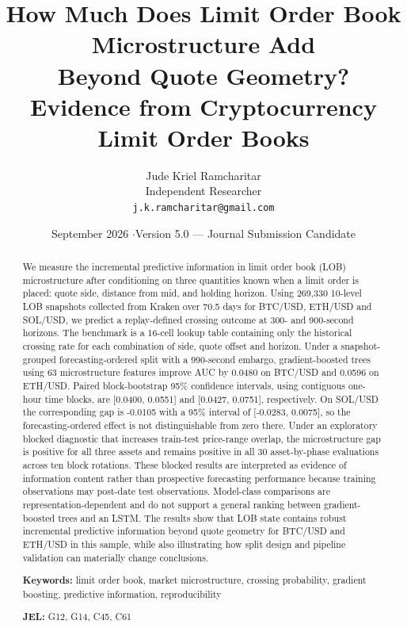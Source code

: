 \documentclass[11pt]{article}
\title{\textbf{How Much Does Limit Order Book Microstructure Add\\
Beyond Quote Geometry?}\\[0.4em]
\large Evidence from Cryptocurrency Limit Order Books}
\author{Jude Kriel Ramcharitar\\
\small Independent Researcher\\
\small \texttt{j.k.ramcharitar@gmail.com}}
\date{September 2026 \quad$\cdot$\quad Version 5.0 --- Journal Submission Candidate}
\begin{document}
\maketitle

\begin{abstract}
\noindent
We measure the incremental predictive information in limit order book (LOB)
microstructure after conditioning on three quantities known when a limit order
is placed: quote side, distance from mid, and holding horizon. Using 269{,}330
10-level LOB snapshots collected from Kraken over 70.5 days for BTC/USD,
ETH/USD and SOL/USD, we predict a replay-defined crossing outcome at 300- and
900-second horizons. The benchmark is a 16-cell lookup table containing only
the historical crossing rate for each combination of side, quote offset and
horizon. Under a snapshot-grouped forecasting-ordered split with a 990-second
embargo, gradient-boosted trees using 63 microstructure features improve AUC by
0.0480 on BTC/USD and 0.0596 on ETH/USD. Paired block-bootstrap 95\% confidence
intervals, using contiguous one-hour time blocks, are [0.0400, 0.0551] and
[0.0427, 0.0751], respectively. On SOL/USD the corresponding gap is -0.0105
with a 95\% interval of [-0.0283, 0.0075], so the forecasting-ordered effect is
not distinguishable from zero there. Under an exploratory blocked diagnostic
that increases train-test price-range overlap, the microstructure gap is
positive for all three assets and remains positive in all 30 asset-by-phase
evaluations across ten block rotations. These blocked results are interpreted
as evidence of information content rather than prospective forecasting
performance because training observations may post-date test observations.
Model-class comparisons are representation-dependent and do not support a
general ranking between gradient-boosted trees and an LSTM. The results show
that LOB state contains robust incremental predictive information beyond quote
geometry for BTC/USD and ETH/USD in this sample, while also illustrating how
split design and pipeline validation can materially change conclusions.

\vspace{0.8em}
\noindent\textbf{Keywords:} limit order book, market microstructure, crossing
probability, gradient boosting, predictive information, reproducibility

\vspace{0.3em}
\noindent\textbf{JEL:} G12, G14, C45, C61
\end{abstract}

\vspace{1em}
\end{document}
